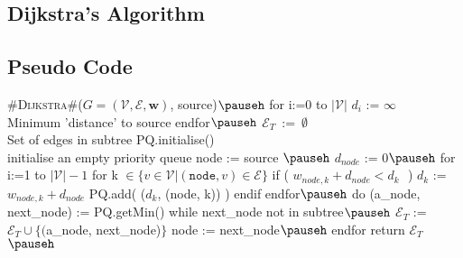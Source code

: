 \begin{slide}
\section[-2]{Dijkstra's Algorithm}

\pb
\begin{center}
  \pause
\end{center}
\end{slide}


\begin{slide}
\section[-2.4]{Pseudo Code}

\begin{pseudo}
#\textsc{Dijkstra}#($G=(\mathcal{V},\mathcal{E},\bm{w})$, source)$\pauseh$ {
   for i:=0 to $|\mathcal{V}|$
      $d_i$ := $\infty$               \\ Minimum 'distance' to source
   endfor$\pauseh$
   $\mathcal{E}_T\,$ := $\,\emptyset$                  \\ Set of edges in subtree
   PQ.initialise()       \\ initialise an empty priority queue
   node := source              $\pauseh$
   $d_{node}$ := 0$\pauseh$
   for i:=1 to $|\mathcal{V}|-1$
      for k $\in \{v\in\mathcal{V}| (\mathtt{node},v)\in\mathcal{E}\}$ 
         if ( $w_{node,k}+d_{node} < d_{k}\,\,$  )
            $d_{k}$ := $w_{node,k}+d_{node}$
            PQ.add( ($d_{k}$, (node, k)) )
         endif
      endfor$\pauseh$
      do
         (a_node, next_node) := PQ.getMin()
      while next_node not in subtree$\pauseh$
      $\mathcal{E}_T$ := $\mathcal{E}_T \cup \{($a_node, next_node)$\}$
      node := next_node$\pauseh$
   endfor
   return $\mathcal{E}_T$
}$\pauseh$
\end{pseudo}
\vspace*{-1cm}

\end{slide}

